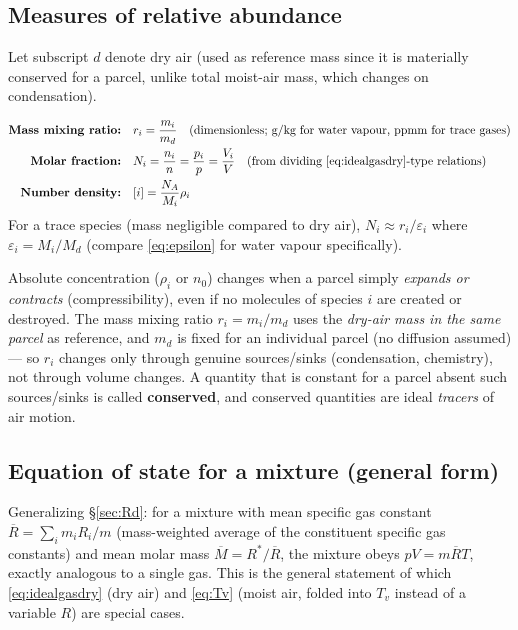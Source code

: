 \documentclass[11pt]{article}
\begin{document}
\subsection{Measures of relative abundance}
Let subscript $d$ denote dry air (used as reference mass since it is materially conserved for a parcel, unlike total moist-air mass, which changes on condensation).

\begin{align}
\textbf{Mass mixing ratio:}\quad & r_i = \frac{m_i}{m_d} \quad \text{(dimensionless; g/kg for water vapour, ppmm for trace gases)}\\
\textbf{Molar fraction:}\quad & N_i = \frac{n_i}{n} = \frac{p_i}{p} = \frac{V_i}{V} \quad \text{(from dividing \eqref{eq:idealgasdry}-type relations)} \\
\textbf{Number density:}\quad & [i] = \frac{N_A}{M_i}\rho_i
\end{align}
For a trace species (mass negligible compared to dry air), $N_i \approx r_i/\varepsilon_i$ where $\varepsilon_i = M_i/M_d$ (compare \eqref{eq:epsilon} for water vapour specifically).

\begin{defbox}
Absolute concentration ($\rho_i$ or $n_0$) changes when a parcel simply \emph{expands or contracts} (compressibility), even if no molecules of species $i$ are created or destroyed. The mass mixing ratio $r_i=m_i/m_d$ uses the \emph{dry-air mass in the same parcel} as reference, and $m_d$ is fixed for an individual parcel (no diffusion assumed) — so $r_i$ changes only through genuine sources/sinks (condensation, chemistry), not through volume changes. A quantity that is constant for a parcel absent such sources/sinks is called \textbf{conserved}, and conserved quantities are ideal \emph{tracers} of air motion.
\end{defbox}

\subsection{Equation of state for a mixture (general form)}
Generalizing \S\ref{sec:Rd}: for a mixture with mean specific gas constant $\overline R = \sum_i m_i R_i / m$ (mass-weighted average of the constituent specific gas constants) and mean molar mass $\overline M = R^*/\overline R$, the mixture obeys $pV = m\overline R T$, exactly analogous to a single gas. This is the general statement of which \eqref{eq:idealgasdry} (dry air) and \eqref{eq:Tv} (moist air, folded into $T_v$ instead of a variable $R$) are special cases.
\end{document}
